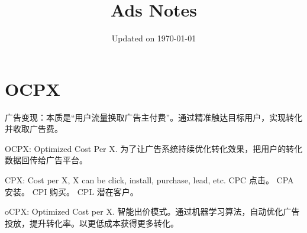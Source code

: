 \documentclass{article}
\title{Ads Notes}
\author{\mathfrak{Y} \mathfrak{R} }
\date{Updated on \today}
\begin{document}
\maketitle
\section{OCPX}
广告变现：本质是“用户流量换取广告主付费”。通过精准触达目标用户，实现转化并收取广告费。

OCPX: Optimized Cost Per X. 为了让广告系统持续优化转化效果，把用户的转化数据回传给广告平台。

CPX: Cost per X, X can be click, install, purchase, lead, etc. CPC 点击。 CPA 安装。 CPI 购买。 CPL 潜在客户。

oCPX: Optimized Cost per X. 智能出价模式。通过机器学习算法，自动优化广告投放，提升转化率。以更低成本获得更多转化。
\end{document}
